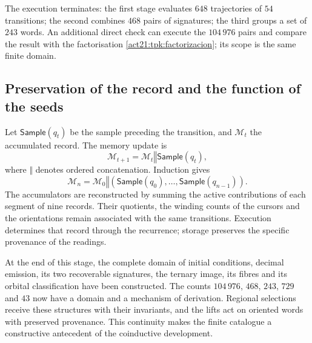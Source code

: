 The execution terminates: the first stage evaluates \(648\) trajectories
of \(54\) transitions; the second combines \(468\) pairs of signatures;
the third groups a set of \(243\) words. An additional direct check can
execute the \(104\,976\) pairs and compare the result with the
factorisation \eqref{act21:tpk:factorizacion}; its scope is the same finite
domain.

\subsection{Preservation of the record and the function of the seeds}
\label{act21:tpk:conclusion}

Let \(\mathsf{Sample}(q_t)\) be the sample preceding the transition, and
\(\mathcal M_t\) the accumulated record. The memory update is
\begin{equation}
 \mathcal M_{t+1}=\mathcal M_t\mathbin{\Vert}\mathsf{Sample}(q_t),
 \label{act21:tpk:archivo}
\end{equation}
where \(\Vert\) denotes ordered concatenation. Induction gives
\[
 \mathcal M_n=\mathcal M_0\mathbin{\Vert}
 (\mathsf{Sample}(q_0),\ldots,\mathsf{Sample}(q_{n-1})).
\]
The accumulators are reconstructed by summing the active contributions
of each segment of nine records. Their quotients, the winding counts
of the cursors and the orientations remain associated with the same
transitions. Execution determines that record through the recurrence;
storage preserves the specific provenance of the readings.





At the end of this stage, the complete domain of initial conditions,
decimal emission, its two recoverable signatures, the ternary image,
its fibres and its orbital classification have been constructed.
The counts \(104\,976\), \(468\), \(243\), \(729\) and \(43\) now
have a domain and a mechanism of derivation. Regional selections receive
these structures with their invariants, and the lifts act on oriented
words with preserved provenance. This continuity makes the finite
catalogue a constructive antecedent of the coinductive development.
